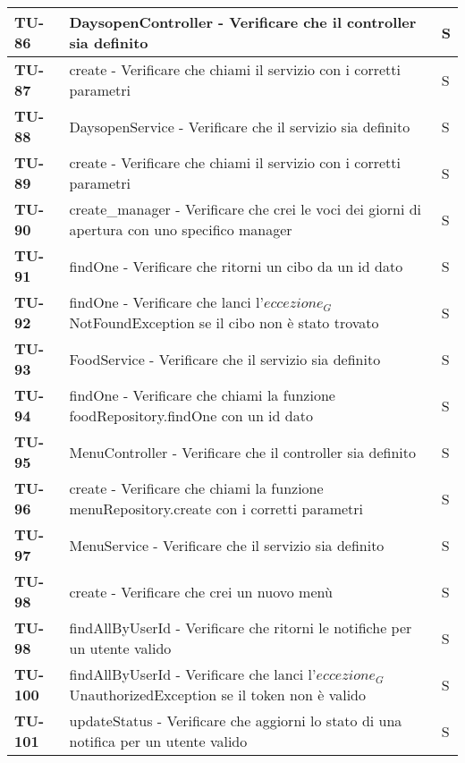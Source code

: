 \begin{longtable}{|>{\centering\arraybackslash}p{2cm}|p{15cm}|p{1cm}|}
  \textbf{TU-86} & DaysopenController - Verificare che il controller sia definito   & S \\
  \hline
  \rowcolor{gray!10}
  \textbf{TU-87} & create - Verificare che chiami il servizio con i corretti parametri    & S \\ 
  \hline
  \rowcolor{gray!10}
  \textbf{TU-88} & DaysopenService - Verificare che il servizio sia definito    & S \\ 
  \hline
  \rowcolor{gray!10}
  \textbf{TU-89} & create - Verificare che chiami il servizio con i corretti parametri      & S \\ 
  \hline
  \rowcolor{gray!10}
  \textbf{TU-90} & create\_manager - Verificare che crei le voci dei giorni di apertura con uno specifico manager  & S \\ 
  \hline
  \rowcolor{gray!10}
  \textbf{TU-91} & findOne - Verificare che ritorni un cibo da un id dato  & S \\ 
  \hline
  \rowcolor{gray!10}
  \textbf{TU-92} & findOne - Verificare che lanci l'$\textit{eccezione}_G$ NotFoundException se il cibo non è stato trovato   & S \\ 
  \hline
  \rowcolor{gray!10}
  \textbf{TU-93} & FoodService - Verificare che il servizio sia definito   & S \\ 
  \hline
  \rowcolor{gray!10}
  \textbf{TU-94} & findOne - Verificare che chiami la funzione  foodRepository.findOne con un id dato & S \\ 
  \hline
  \rowcolor{gray!10}
  \textbf{TU-95} & MenuController - Verificare che il controller sia definito  & S \\ 
  \hline
  \rowcolor{gray!10}
  \textbf{TU-96} & create - Verificare che chiami la funzione menuRepository.create con i corretti parametri  & S \\ 
  \hline
  \rowcolor{gray!10}
  \textbf{TU-97} & MenuService - Verificare che il servizio sia definito & S \\ 
  \hline
  \rowcolor{gray!10}
  \textbf{TU-98} & create - Verificare che crei un nuovo menù  & S \\ 
  \hline
  \rowcolor{gray!10}
  \textbf{TU-98} & findAllByUserId - Verificare che ritorni le notifiche per un utente valido  & S \\ 
  \hline
  \rowcolor{gray!10}
  \textbf{TU-100} & findAllByUserId - Verificare che lanci l'$\textit{eccezione}_G$ UnauthorizedException se il token non è valido  & S \\ 
  \hline
  \rowcolor{gray!10}
  \textbf{TU-101} & updateStatus - Verificare che aggiorni lo stato di una notifica per un utente valido  & S \\ 

\end{longtable}
